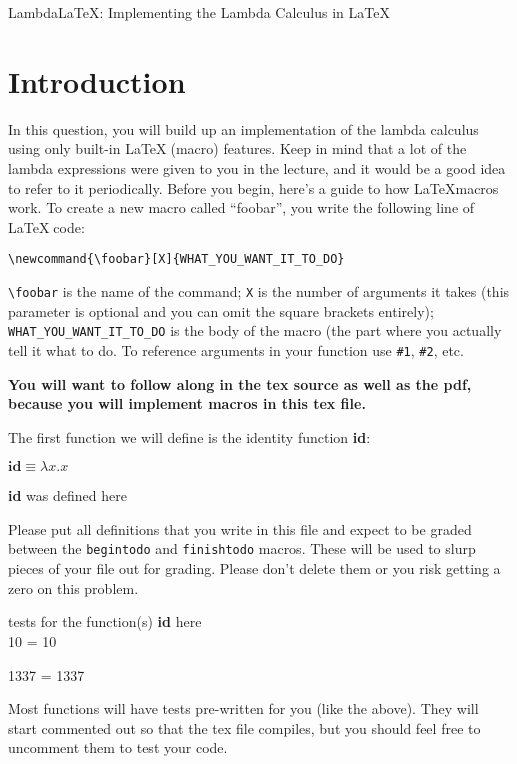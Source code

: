 \documentclass{article}
\newcommand{\op}[1]{\textbf{#1}}
\newcommand{\lcalc}[1]{\begin{center}\ensuremath{#1}\end{center}}
\newcommand{\begindone}[1]{\begin{center}\op{#1} was defined here\end{center}}
\newcommand{\finishdone}[1]{}
\newcommand{\test}[2]{#1 = #2\par}
\newcommand{\begintests}[1]{\begin{center}tests for the function(s) \op{#1} here\\}
\newcommand{\finishtests}[1]{\end{center}}
\begin{document}
\begin{center}
    {\large Lambda\LaTeX: Implementing the Lambda Calculus in \LaTeX}
\end{center}
\section{Introduction}
In this question, you will build up an implementation of the lambda calculus using only
built-in \LaTeX$\;$(macro) features.  Keep in mind that a lot of the lambda expressions
were given to you in the lecture, and it would be a good idea to refer to it periodically.
Before you begin, here's a guide to how \LaTeX macros work.  To create a new macro
called ``foobar'', you write the following line of \LaTeX$\;$code:
\begin{center}
\verb+\newcommand{\foobar}[X]{WHAT_YOU_WANT_IT_TO_DO}+
\end{center}

\verb+\foobar+ is the name of the command; \verb+X+ is the number of arguments it takes 
(this parameter is optional and you can omit the square brackets entirely); \verb+WHAT_YOU_WANT_IT_TO_DO+ is the body
of the macro (the part where you actually tell it what to do.  To reference arguments in your function use \verb+#1+, \verb+#2+, etc.

\textbf{You will want to follow along in the tex source as well as the pdf, because you will implement macros
in this tex file.}


The first function we will define is the identity function \op{id}:

\lcalc{\op{id} \equiv \lambda x.x}

\begindone{id}
\newcommand{\id}[1]{#1}
\finishdone{id}

Please put all definitions that you write in this file and expect to be graded between the \verb+begintodo+ and \verb+finishtodo+ macros.
These will be used to slurp pieces of your file out for grading.  Please don't delete them or you risk getting a zero on this problem.

\begintests{id}
\test{\id{10}}{10}
\test{\id{1337}}{1337}
\finishtests{id}

Most functions will have tests pre-written for you (like the above).  They will start commented out so that the tex file compiles, but you should feel free to
uncomment them to test your code.
\end{document}
